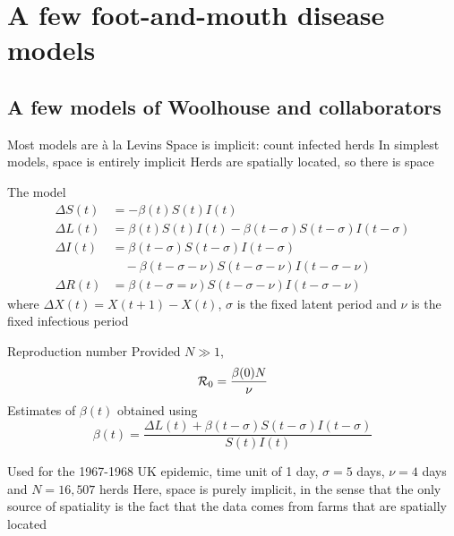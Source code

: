 \documentclass[aspectratio=43]{beamer}
\begin{document}
\section{A few foot-and-mouth disease models}

\subsection{A few models of Woolhouse and collaborators}
\begin{frame}{Most models are \`a la Levins}
    Space is implicit: count infected herds
	\vfill
	In simplest models, space is entirely implicit
	\vfill
	Herds are spatially located, so there is space
\end{frame}


\begin{frame}{The model}
	\begin{subequations}
		\begin{align}
			\Delta S(t) &= -\beta(t)S(t)I(t) \\
			\Delta L(t) &= \beta(t)S(t)I(t) -\beta(t-\sigma)S(t-\sigma)I(t-\sigma) \\
			\Delta I(t) &= \beta(t-\sigma)S(t-\sigma)I(t-\sigma) \nonumber \\
			&\quad -\beta(t-\sigma-\nu)S(t-\sigma-\nu)I(t-\sigma-\nu) \\
			\Delta R(t) &= \beta(t-\sigma=\nu)S(t-\sigma-\nu)I(t-\sigma-\nu)
		\end{align}
	\end{subequations}
	where $\Delta X(t)=X(t+1)-X(t)$, $\sigma$ is the fixed latent period and $\nu$ is the fixed infectious period
\end{frame}

\begin{frame}{Reproduction number}
	Provided $N\gg 1$, 
	\[
		\mathcal{R}_0=\frac{\beta(0)N}{\nu}
	\]
	\vfill
	Estimates of $\beta(t)$ obtained using
	\[
		\beta(t)=\frac{\Delta L(t)+\beta(t-\sigma)S(t-\sigma)I(t-\sigma)}{S(t)I(t)}
	\]
\end{frame}

\begin{frame}
	Used for the 1967-1968 UK epidemic, time unit of 1 day, $\sigma=5$ days, $\nu=4$ days and $N=16,507$ herds
	\vfill
	Here, space is purely implicit, in the sense that the only source of spatiality is the fact that the data comes from farms that are spatially located
\end{frame}
\end{document}

